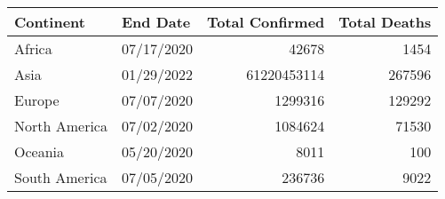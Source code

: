 \begin{tabular}{llrr}
\toprule
     Continent &    End Date & Total Confirmed & Total Deaths \\
\midrule
        Africa &  07/17/2020 &           42678 &         1454 \\
          Asia &  01/29/2022 &     61220453114 &       267596 \\
        Europe &  07/07/2020 &         1299316 &       129292 \\
 North America &  07/02/2020 &         1084624 &        71530 \\
       Oceania &  05/20/2020 &            8011 &          100 \\
 South America &  07/05/2020 &          236736 &         9022 \\
\bottomrule
\end{tabular}

